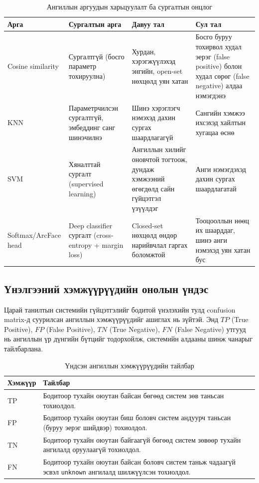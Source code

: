 \begin{table}[H]
\centering
\caption{Ангиллын аргуудын харьцуулалт ба сургалтын онцлог}
\begin{tabularx}{\textwidth}{|l|X|X|X|}
\hline
\textbf{Арга} & \textbf{Сургалтын арга} & \textbf{Давуу тал} & \textbf{Сул тал} \\
\hline
Cosine similarity & Сургалтгүй (босго параметр тохируулна) & Хурдан, хэрэгжүүлэхэд энгийн, open-set нөхцөлд уян хатан & Босго буруу тохирвол худал эерэг (false positive) болон худал сөрөг (false negative) алдаа нэмэгдэнэ \\
\hline
KNN & Параметрчилсэн сургалтгүй, эмбеддинг санг шинэчилнэ & Шинэ хэрэглэгч нэмэхэд дахин сургах шаардлагагүй & Сангийн хэмжээ ихсэхэд хайлтын хугацаа өснө \\
\hline
SVM & Хяналттай сургалт (supervised learning) & Ангиллын хилийг оновчтой тогтоож, дундаж хэмжээний өгөгдөлд сайн гүйцэтгэл үзүүлдэг & Анги нэмэгдэхэд дахин сургах шаардлагатай \\
\hline
Softmax/ArcFace head & Deep classifier сургалт (cross-entropy + margin loss) & Closed-set нөхцөлд өндөр нарийвчлал гаргах боломжтой & Тооцооллын нөөц их шаарддаг, шинэ анги нэмэхэд уян хатан бус \\
\hline
\end{tabularx}
\end{table}

\subsection{Үнэлгээний хэмжүүрүүдийн онолын үндэс}

Царай танилтын системийн гүйцэтгэлийг бодитой үнэлэхийн тулд confusion matrix-д суурилсан ангиллын хэмжүүрүүдийг ашиглах нь зүйтэй. Энд $TP$ (True Positive), $FP$ (False Positive), $TN$ (True Negative), $FN$ (False Negative) утгууд нь ангиллын үр дүнгийн бүтцийг тодорхойлж, системийн алдааны шинж чанарыг тайлбарлана.

\begin{table}[H]
\centering
\caption{Үндсэн ангиллын хэмжүүрүүдийн тайлбар}
\label{tab:metric-glossary-theory}
\begin{tabularx}{\textwidth}{|l|X|}
\hline
\textbf{Хэмжүүр} & \textbf{Тайлбар} \\
\hline
TP & Бодитоор тухайн оюутан байсан бөгөөд систем зөв таньсан тохиолдол. \\
\hline
FP & Бодитоор тухайн оюутан биш боловч систем андуурч таньсан (буруу эерэг шийдвэр) тохиолдол. \\
\hline
TN & Бодитоор тухайн оюутан байгаагүй бөгөөд систем зөвөөр тухайн ангилалд оруулаагүй тохиолдол. \\
\hline
FN & Бодитоор тухайн оюутан байсан боловч систем таньж чадаагүй эсвэл \texttt{unknown} ангилалд шилжүүлсэн тохиолдол. \\
\hline
\end{tabularx}
\end{table}


